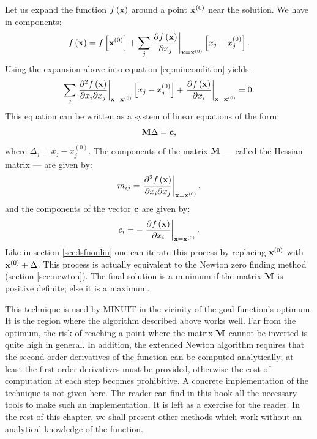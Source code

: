 \documentclass[twoside]{book}
\begin{document}
Let us expand the function $f\left({\bf x}\right)$ around a point
${\bf x}^{\left(0\right)}$ near the solution. We have in
components:
\begin{equation}
  f\left({\bf x}\right) = f\left[{\bf x}^{\left(0\right)}\right] +\sum_j
  \left.{\partial f\left({\bf x}\right) \over \partial x_j}\right|_{{\bf x}={\bf
  x}^{\left(0\right)}}
  \left[x_j-x^{\left(0\right)}_j\right].
\end{equation}
Using the expansion above into equation \ref{eq:mincondition}
yields:
\begin{equation}
\sum_j
  \left.{\partial^2 f\left({\bf x}\right) \over \partial x_i\partial x_j}\right|_{{\bf x}={\bf
  x}^{\left(0\right)}}
  \left[x_j-x^{\left(0\right)}_j\right]
  + \left.{\partial f\left({\bf x}\right) \over \partial x_i}\right|_{{\bf x}={\bf
  x}^{\left(0\right)}} =0.
\end{equation}
This equation can be written as a system of linear equations of
the form
\begin{equation}
  {\bf M}\Delta = {\bf c},
\end{equation}
where $\Delta_j =x_j-x^{\left(0\right)}_j$. The components of the
matrix ${\bf M}$ --- called the Hessian matrix --- are given by:
\begin{equation}
  m_{ij} = \left.{\partial^2 f\left({\bf x}\right) \over \partial x_i\partial x_j}\right|_{{\bf x}={\bf
  x}^{\left(0\right)}},
\end{equation}
and the components of the vector ${\bf c}$ are given by:
\begin{equation}
  c_i = -\left.{\partial f\left({\bf x}\right) \over \partial x_i}\right|_{{\bf x}={\bf
  x}^{\left(0\right)}}.
\end{equation}
Like in section \ref{sec:lsfnonlin} one can iterate this process
by replacing ${\bf x}^{\left(0\right)}$ with ${\bf
x}^{\left(0\right)}+\Delta$. This process is actually equivalent
to the Newton zero finding method (\cf section \ref{sec:newton}).
The final solution is a minimum if the matrix ${\bf M}$ is
positive definite; else it is a maximum.

This technique is used by MINUIT in the vicinity of the goal
function's optimum. It is the region where the algorithm described
above works well. Far from the optimum, the risk of reaching a
point where the matrix ${\bf M}$ cannot be inverted is quite high
in general. In addition, the extended Newton algorithm requires
that the second order derivatives of the function can be computed
analytically; at least the first order derivatives must be
provided, otherwise the cost of computation at each step becomes
prohibitive. A concrete implementation of the technique is not
given here. The reader can find in this book all the necessary
tools to make such an implementation. It is left as a exercise for
the reader. In the rest of this chapter, we shall present other
methods which work without an analytical knowledge of the
function.
\end{document}
